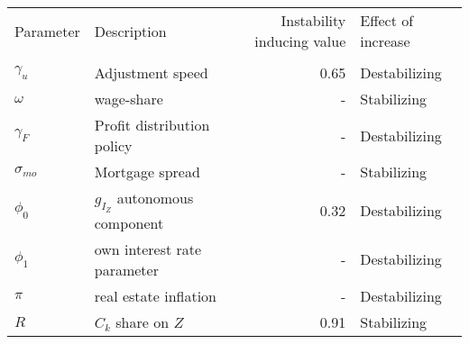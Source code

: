 \begin{table}
\centering
\label{tab:sensibility}
\begin{tabular}{llrl}
\toprule
Parameter &                     Description &  Instability inducing value & Effect of increase \\
              &                                 &                             &                    \\
\midrule
$\gamma_u$    &                Adjustment speed &                        0.65 &      Destabilizing \\
$\omega$      &                      wage-share &                           - &        Stabilizing \\
$\gamma_F$    &      Profit distribution policy &                           - &      Destabilizing \\
$\sigma_{mo}$ &                 Mortgage spread &                           - &        Stabilizing \\
$\phi_0$      &  $g_{I_Z}$ autonomous component &                        0.32 &      Destabilizing \\
$\phi_1$      &     own interest rate parameter &                           - &      Destabilizing \\
$\pi$         &           real estate inflation &                           - &      Destabilizing \\
$R$           &              $C_k$ share on $Z$ &                        0.91 &        Stabilizing \\
\bottomrule
\end{tabular}
\end{table}
